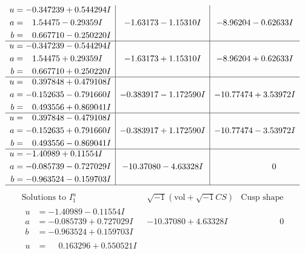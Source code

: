 \documentclass[1p]{elsarticle_modified}
\theoremstyle{definition}
\newcommand{\I}{\sqrt{-1}}
\begin{document}
$$\begin{array}{c|c|c}
\begin{aligned}
u &= -0.347239 + 0.544294 I \\
a &= \phantom{-}1.54475 - 0.29359 I \\
b &= \phantom{-}0.667710 - 0.250220 I\end{aligned}
 & -1.63173 - 1.15310 I & -8.96204 - 0.62633 I \\ \hline\begin{aligned}
u &= -0.347239 - 0.544294 I \\
a &= \phantom{-}1.54475 + 0.29359 I \\
b &= \phantom{-}0.667710 + 0.250220 I\end{aligned}
 & -1.63173 + 1.15310 I & -8.96204 + 0.62633 I \\ \hline\begin{aligned}
u &= \phantom{-}0.397848 + 0.479108 I \\
a &= -0.152635 - 0.791660 I \\
b &= \phantom{-}0.493556 + 0.869041 I\end{aligned}
 & -0.383917 - 1.172590 I & -10.77474 + 3.53972 I \\ \hline\begin{aligned}
u &= \phantom{-}0.397848 - 0.479108 I \\
a &= -0.152635 + 0.791660 I \\
b &= \phantom{-}0.493556 - 0.869041 I\end{aligned}
 & -0.383917 + 1.172590 I & -10.77474 - 3.53972 I \\ \hline\begin{aligned}
u &= -1.40989 + 0.11554 I \\
a &= -0.085739 - 0.727029 I \\
b &= -0.963524 - 0.159703 I\end{aligned}
 & -10.37080 - 4.63328 I & \phantom{-0.000000 } 0\\
 \hline 
 \end{array}$$\newpage$$\begin{array}{c|c|c}  
\text{Solutions to }I^u_{1}& \I (\text{vol} + \sqrt{-1}CS) & \text{Cusp shape}\\
 \hline 
\begin{aligned}
u &= -1.40989 - 0.11554 I \\
a &= -0.085739 + 0.727029 I \\
b &= -0.963524 + 0.159703 I\end{aligned}
 & -10.37080 + 4.63328 I & \phantom{-0.000000 } 0 \\ \hline\begin{aligned}
u &= \phantom{-}0.163296 + 0.550521 I \\

\end{aligned}
\end{array}$$
\end{document}
